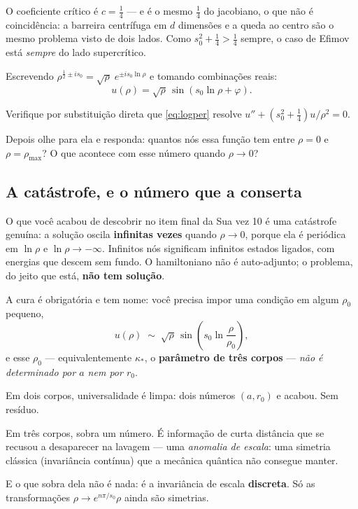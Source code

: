 \documentclass[11pt,a4paper]{article}
\begin{document}
O coeficiente crítico é $c=\tfrac14$ --- e é o mesmo $\tfrac14$ do jacobiano, o que
não é coincidência: a barreira centrífuga em $d$ dimensões e a queda ao centro são o
mesmo problema visto de dois lados. Como $s_{0}^{2}+\tfrac14 > \tfrac14$ sempre, o
caso de Efimov está \emph{sempre} do lado supercrítico.

Escrevendo $\rho^{\frac12 \pm i s_{0}} = \sqrt\rho\;e^{\pm i s_{0}\ln\rho}$ e tomando
combinações reais:
\begin{equation}
u(\rho) = \sqrt{\rho}\,\sin\!\left(s_{0}\ln\rho + \varphi\right).
\label{eq:logper}
\end{equation}

\begin{suavez}
Verifique por substituição direta que \eqref{eq:logper} resolve
$u''+(s_{0}^{2}+\tfrac14)u/\rho^{2}=0$.

Depois olhe para ela e responda: quantos nós essa função tem entre $\rho=0$ e
$\rho=\rho_{\max}$? O que acontece com esse número quando $\rho\to 0$?

\vspace{2.2cm}
\hrulefill
\end{suavez}

\subsection{A catástrofe, e o número que a conserta}

O que você acabou de descobrir no item final da Sua vez 10 é uma catástrofe genuína:
a solução oscila \textbf{infinitas vezes} quando $\rho\to0$, porque ela é periódica em
$\ln\rho$ e $\ln\rho \to -\infty$. Infinitos nós significam infinitos estados ligados,
com energias que descem sem fundo. O hamiltoniano não é auto-adjunto; o problema, do
jeito que está, \textbf{não tem solução}.

A cura é obrigatória e tem nome: você precisa impor uma condição em algum
$\rho_{0}$ pequeno,
\begin{equation}
u(\rho) \;\sim\; \sqrt{\rho}\,\sin\!\left(s_{0}\ln\frac{\rho}{\rho_{0}}\right),
\end{equation}
e esse $\rho_{0}$ --- equivalentemente $\kappa_{*}$, o \textbf{parâmetro de três
corpos} --- \emph{não é determinado por $a$ nem por $r_{0}$}.

\begin{ideia}
Em dois corpos, universalidade é limpa: dois números $(a,r_{0})$ e acabou. Sem
resíduo.

Em três corpos, sobra um número. É informação de curta distância que se recusou a
desaparecer na lavagem --- uma \emph{anomalia de escala}: uma simetria clássica
(invariância contínua) que a mecânica quântica não consegue manter.

E o que sobra dela não é nada: é a invariância de escala \textbf{discreta}. Só as
transformações $\rho \to e^{n\pi/s_{0}}\rho$ ainda são simetrias.
\end{ideia}
\end{document}
